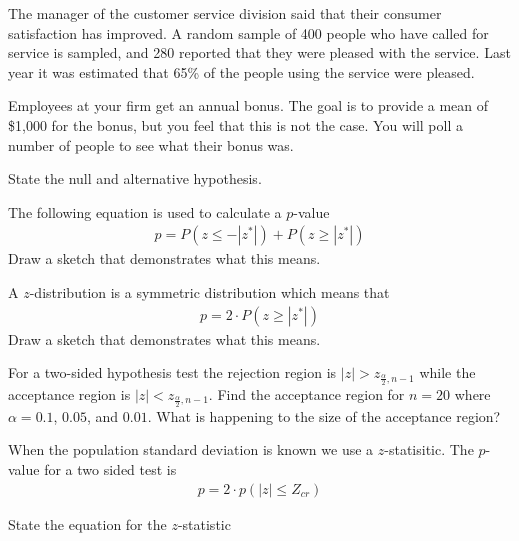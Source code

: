 \begin{problem}
\begin{subproblem}
  \item The manager of the customer service division said that their
    consumer satisfaction has improved. A random sample of 400 people
    who have called for service is sampled, and 280 reported that they
    were pleased with the service. Last year it was estimated that
    65\% of the people using the service were pleased. 

    \vfill

  \end{subproblem}

\clearpage

\item Employees at your firm get an annual bonus. The goal is to
  provide a mean of \$1,000 for the bonus, but you feel that this is
  not the case. You will poll a number of people to see what their
  bonus was.

\begin{subproblem}
\item State the null and alternative hypothesis.
  \vspace*{2em}

\item The following equation is used to calculate a $p$-value
  \begin{eqnarray*}
    p = P(z \le -|z^*|) + P(z \ge |z^*|)
  \end{eqnarray*}
  Draw a sketch that demonstrates what this means.

  \vfill

\item A $z$-distribution is a symmetric distribution which means that
  \begin{eqnarray*}
    p = 2 \cdot  P(z \ge |z^*|)
  \end{eqnarray*}
  Draw a sketch that demonstrates what this means.

  \vfill



\item For a two-sided hypothesis test the rejection region is
  $|z| > z_{\frac{\alpha}{2},n-1}$ while the acceptance region is
  $|z| < z_{\frac{\alpha}{2},n-1}$.  Find the acceptance region for
  $n=20$ where $\alpha = 0.1$, $0.05$, and $0.01$. What is happening
  to the size of the acceptance region?

  \vfill

\end{subproblem}

\clearpage

\item When the population standard deviation is known we use a
  $z$-statisitic. The $p$-value for a two sided test is 
  \begin{eqnarray*}
    p = 2 \cdot p(|z|\leq Z_{cr} )
  \end{eqnarray*}
  \begin{subproblem}
  \item State the equation for the $z$-statistic
    \vfill


\end{subproblem}
\end{problem}
